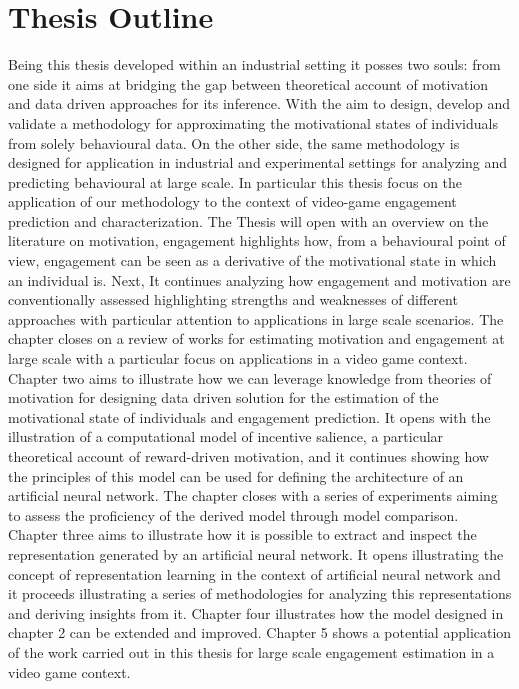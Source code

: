\section{Thesis Outline}
Being this thesis developed within an industrial setting it posses two souls: from one side it aims at bridging the gap between theoretical account of motivation and data driven approaches for its inference. With the aim to design, develop and validate a methodology for approximating the motivational states of individuals from solely behavioural data. On the other side, the same methodology is designed for application in industrial and experimental settings for analyzing and predicting behavioural at large scale. In particular this thesis focus on the application of our methodology to the context of video-game engagement prediction and characterization. The Thesis will open with an overview on the literature on motivation, engagement highlights how, from a behavioural point of view, engagement can be seen as a derivative of the motivational state in which an individual is. Next, It continues analyzing how engagement and motivation are conventionally assessed highlighting strengths and weaknesses of different approaches with particular attention to applications in large scale scenarios. The chapter closes on a review of works for estimating motivation and engagement at large scale with a particular focus on applications in a video game context. Chapter two aims to illustrate how we can leverage knowledge from theories of motivation for designing data driven solution for the estimation of the motivational state of individuals and engagement prediction. It opens with the illustration of a computational model of incentive salience, a particular theoretical account of reward-driven motivation, and it continues showing how the principles of this model can be used for defining the architecture of an artificial neural network. The chapter closes with a series of experiments aiming to assess the proficiency of the derived model through model comparison. Chapter three aims to illustrate how it is possible to extract and inspect the representation generated by an artificial neural network. It opens illustrating the concept of representation learning in the context of artificial neural network and it proceeds illustrating a series of methodologies for analyzing this representations and deriving insights from it. Chapter four illustrates how the model designed in chapter 2 can be extended and improved. Chapter 5 shows a potential application of the work carried out in this thesis for large scale engagement estimation in a video game context.


